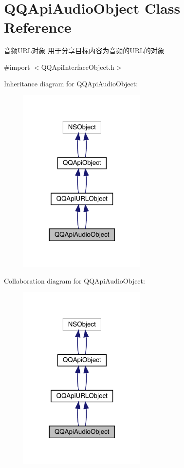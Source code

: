 \hypertarget{interface_q_q_api_audio_object}{}\section{Q\+Q\+Api\+Audio\+Object Class Reference}
\label{interface_q_q_api_audio_object}


音频\+U\+R\+L对象 用于分享目标内容为音频的\+U\+R\+L的对象  




{\ttfamily \#import $<$Q\+Q\+Api\+Interface\+Object.\+h$>$}



Inheritance diagram for Q\+Q\+Api\+Audio\+Object\+:\nopagebreak
\begin{figure}[H]
\begin{center}
\leavevmode
\includegraphics[width=180pt]{interface_q_q_api_audio_object__inherit__graph}
\end{center}
\end{figure}


Collaboration diagram for Q\+Q\+Api\+Audio\+Object\+:\nopagebreak
\begin{figure}[H]
\begin{center}
\leavevmode
\includegraphics[width=180pt]{interface_q_q_api_audio_object__coll__graph}
\end{center}
\end{figure}
